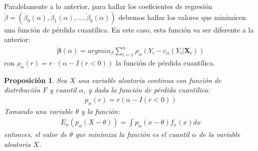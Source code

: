 \documentclass[11pt]{book}
\theoremstyle{plain} %
\newtheorem{proposition}{Proposición}
\theoremstyle{definition} %
\begin{document}
Paralelamente a lo anterior, para hallar los coeficientes de regresión 
$\dot{\beta} = (\dot{\beta}_0(\alpha), \dot{\beta}_1(\alpha), \dots, \dot{\beta}_k(\alpha))$
debemos hallar los valores que minimicen una función de pérdida cuantílica. 
En este caso, esta función va ser diferente a la anterior:
\begin{align*}
    \mathbf{\dot{\beta}}(\alpha) = argmin_{\beta}\sum_{i=1}^n\rho_{\alpha}(Y_i-c_{\alpha}(Y_i|\mathbf{X}_i))
\end{align*}
con $\rho_{\alpha}(r) = r \cdot (\alpha - I(r<0))$ la función de pérdida cuantílica.
\begin{proposition}
      Sea $X$ una variable aleatoria continua con función de distribución $F$ y 
      cuantil $\alpha$, y dada la función de pérdida cuantílica:
      \begin{align*}
            p_{\alpha}(r) = r(\alpha - I(r<0))
      \end{align*}
      Tomando una variable $\theta$ y la función:
      \begin{align*}
            E_x(p_{\alpha}(X-\theta)) = \int p_{\alpha}(x-\theta)f_x(x)dx
      \end{align*}
      entonces, el valor de $\theta$ que minimiza la función es el cuantil $\alpha$ 
      de la variable aleatoria $X$.
\end{proposition}
\end{document}
